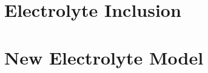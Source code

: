 




\section{Electrolyte Inclusion}\label{sec:electrolyteinclusion}


\section{New Electrolyte Model}\label{sec:newelectrolytemodel}





